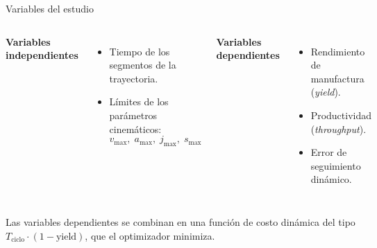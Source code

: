 \documentclass[en,16:9,navbarinline,bigfoot]{sdqbeamer}
\begin{document}
\begin{frame}{Variables del estudio}
    \begin{columns}
        \textbf{Variables independientes}
        \begin{itemize}
            \item Tiempo de los segmentos de la trayectoria.
            \item Límites de los parámetros cinemáticos:
            \[ v_{\max},\; a_{\max},\; j_{\max},\; s_{\max} \]
        \end{itemize}
        \textbf{Variables dependientes}
        \begin{itemize}
            \item Rendimiento de manufactura (\textit{yield}).
            \item Productividad (\textit{throughput}).
            \item Error de seguimiento dinámico.
        \end{itemize}
    \end{columns}
    \vspace{0.4cm}
    \begin{center}
    \small Las variables dependientes se combinan en una función de costo dinámica del tipo $T_{\text{ciclo}} \cdot (1 - \text{yield})$, que el optimizador minimiza.
    \end{center}
\end{frame}
\end{document}
